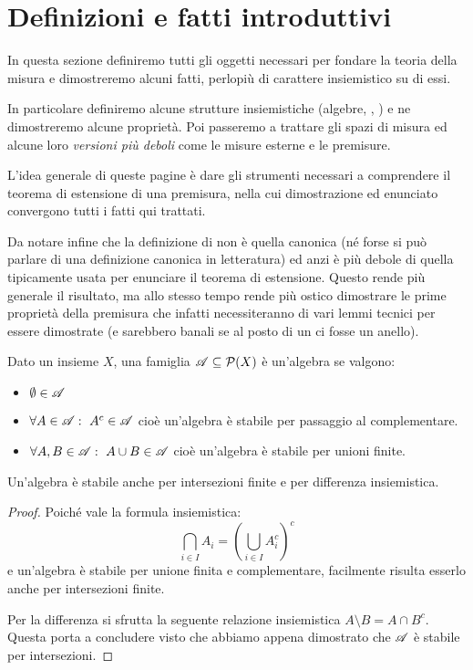 \section{Definizioni e fatti introduttivi}
In questa sezione definiremo tutti gli oggetti necessari per fondare la teoria della misura e dimostreremo alcuni fatti, perlopiù di carattere insiemistico su di essi.

In particolare definiremo alcune strutture insiemistiche (algebre, \sigalg[e], \semiring[i]) e ne dimostreremo alcune proprietà. Poi passeremo a trattare gli spazi di misura ed alcune loro \emph{versioni più deboli} come le misure esterne e le premisure.

L'idea generale di queste pagine è dare gli strumenti necessari a comprendere il teorema di estensione di una premisura, nella cui dimostrazione ed enunciato convergono tutti i fatti qui trattati. 

Da notare infine che la definizione di \semiring{} non è quella canonica (né forse si può parlare di una definizione canonica in letteratura) ed anzi è più debole di quella tipicamente usata per enunciare il teorema di estensione. Questo rende più generale il risultato, ma allo stesso tempo rende più ostico dimostrare le prime proprietà della premisura che infatti necessiteranno di vari lemmi tecnici per essere dimostrate (e sarebbero banali se al posto di un \semiring{} ci fosse un anello).

\begin{definition}[Algebra]
	Dato un insieme $X$, una famiglia $\mathscr A\subseteq\mathcal P(X)$ è un'algebra se valgono:
	\begin{itemize}
		\item $\emptyset\in\mathscr A$
		\item $\forall A\in\mathscr A:\ A^c\in\mathscr A$ cioè un'algebra è stabile per passaggio al complementare.
		\item $\forall A,B\in\mathscr A:\ A\cup B\in\mathscr A$ cioè un'algebra è stabile per unioni finite.
	\end{itemize}
\end{definition}
\begin{remark}\label{nota:ProprietaAlg}
	Un'algebra è stabile anche per intersezioni finite e per differenza insiemistica.
\end{remark}
\begin{proof}
	Poiché vale la formula insiemistica:
	\begin{equation*}
		\bigcap_{i\in I} A_i = \left( \bigcup_{i\in I} A_i^c \right)^c
	\end{equation*}
	e un'algebra è stabile per unione finita e complementare, facilmente risulta esserlo anche per intersezioni finite.
	
	Per la differenza si sfrutta la seguente relazione insiemistica $A\setminus B=A\cap B^c$. Questa porta a concludere visto che abbiamo appena dimostrato che $\mathscr A$ è stabile per intersezioni.
\end{proof}


